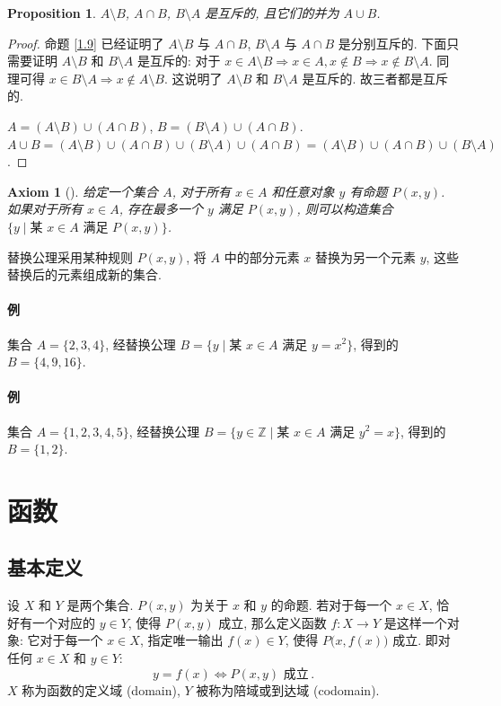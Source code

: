 \documentclass[UTF8]{ctexart}
\theoremstyle{mystyle}
\newtheorem{axiom}{Axiom}[section]
\newtheorem{proposition}{Proposition}[section]
\theoremstyle{myremark}
\theoremstyle{plain}
\newcommand{\Z}{\mathbb Z}
\begin{document}
\begin{proposition} \label{1.10}
    $ A \setminus B $, $ A \cap B $, $ B \setminus A $ 是互斥的, 且它们的并为 $ A \cup B $.
\end{proposition}

\begin{proof}
    命题 \ref{1.9} 已经证明了 $ A \setminus B $ 与 $ A \cap B $, $ B \setminus A $ 与 $ A \cap B $ 是分别互斥的. 下面只需要证明 $ A \setminus B $ 和 $ B \setminus A $ 是互斥的: 对于 $ x \in A \setminus B \Longrightarrow x \in A, x \notin B \Longrightarrow x \notin B \setminus A $. 同理可得 $ x \in B \setminus A \Longrightarrow x \notin A \setminus B $. 这说明了 $ A \setminus B $ 和 $ B \setminus A $ 是互斥的. 故三者都是互斥的.

    $ A = (A \setminus B) \cup (A \cap B) $, $ B = (B \setminus A) \cup (A \cap B) $. $ A \cup B = (A \setminus B) \cup (A \cap B) \cup (B \setminus A) \cup (A \cap B) = (A \setminus B) \cup (A \cap B) \cup (B \setminus A) $.
\end{proof}


\begin{axiom}[]
    给定一个集合 $ A $, 对于所有 $ x \in A $ 和任意对象 $ y $ 有命题 $ P(x, y) $. 如果对于所有 $ x \in A $, 存在最多一个 $ y $ 满足 $ P(x, y) $, 则可以构造集合 $ \{ y \mid \text{某 } x \in A \text{ 满足 } P(x, y) \} $.
\end{axiom}

替换公理采用某种规则 $ P(x, y) $, 将 $ A $ 中的部分元素 $ x $ 替换为另一个元素 $ y $, 这些替换后的元素组成新的集合.

\paragraph{例} 
集合 $ A = \{2, 3, 4\} $, 经替换公理 $ B = \{y \mid \text{某 } x \in A \text{ 满足 } y = x^2 \} $, 得到的 $ B = \{4, 9, 16\} $.

\paragraph{例} 
集合 $ A = \{1, 2, 3, 4, 5\} $, 经替换公理 $ B = \{y \in \Z \mid \text{某 } x \in A \text{ 满足 } y^2 = x \} $, 得到的 $ B = \{1, 2\} $.


\section{函数}
\subsection{基本定义}
\begin{definition}[\text{函数}]
    设 $ X $ 和 $ Y $ 是两个集合. $ P(x, y) $ 为关于 $ x $ 和 $ y $ 的命题. 若对于每一个 $ x \in X $, 恰好有一个对应的 $ y \in Y $, 使得 $ P(x, y) $ 成立, 那么定义函数 $ f \colon X \to Y $ 是这样一个对象: 它对于每一个 $ x \in X $, 指定唯一输出 $ f(x) \in Y $, 使得 $ P \big( x, f(x) \big) $ 成立. 即对任何 $ x \in X $ 和 $ y \in Y $: \[ y = f(x) \Longleftrightarrow P(x, y) \text{ 成立} \,.\] $ X $ 称为函数的定义域 (domain), $ Y $ 被称为陪域或到达域 (codomain).
\end{definition}
\end{document}
